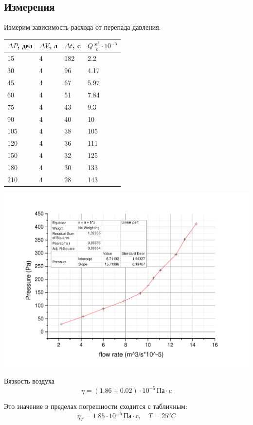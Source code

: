 \documentclass[a4paper,12pt]{article}
\begin{document}
		\subsection{Измерения}
		Измерим зависимость расхода от перепада давления.
		\begin{center}
			\begin{tabular}{  l | l | l | l }
				$\Delta P$, дел & $\Delta V$, л & $\Delta t$, c & $Q\, \frac{\text{м}^3}{c}\cdot 10^{-5}$ \\ \hline
				15 & 4 & 182 & 2.2 \\ \hline
				30 & 4 & 96 & 4.17  \\ \hline
				45 & 4 & 67 & 5.97 \\ \hline
				60 & 4 & 51 & 7.84 \\ \hline
				75 & 4 & 43 & 9.3 \\ \hline
				90 & 4 & 40 & 10 \\ \hline
				105 & 4 & 38 & 105 \\ \hline
				120 & 4 & 36 & 111  \\ \hline
				150 & 4 & 32 & 125 \\ \hline
				180 & 4 & 30 & 133  \\ \hline
				210 & 4 & 28 & 143 \\ \hline				
			\end{tabular}
		\end{center}
		\includegraphics[width = 0.9\linewidth]{graph1}
		
		Вязкость воздуха 
		\[
		\eta = \left(1.86\pm0.02\right)\cdot 10^{-5}\,\text{Па}\cdot\text{c}
		\]
		
		Это значение в пределах погрешности сходится с табличным:
		\[
		\eta_T = 1.85\cdot 10^{-5}\,\text{Па}\cdot\text{c}, \quad T = 25^oC
		\]
		
\end{document}

